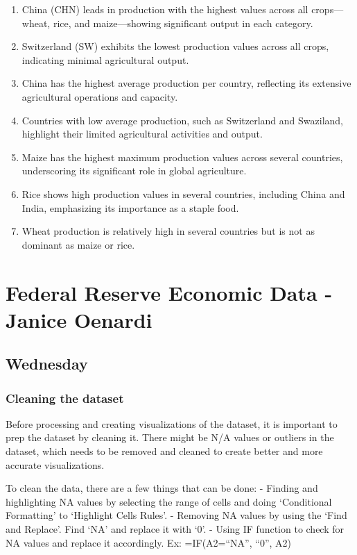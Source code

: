 \documentclass[
  letterpaper,
  DIV=11,
  numbers=noendperiod]{scrreprt}
\begin{document}
\begin{enumerate}
\def\labelenumi{\arabic{enumi}.}
\item
  China (CHN) leads in production with the highest values across all
  crops---wheat, rice, and maize---showing significant output in each
  category.
\item
  Switzerland (SW) exhibits the lowest production values across all
  crops, indicating minimal agricultural output.
\item
  China has the highest average production per country, reflecting its
  extensive agricultural operations and capacity.
\item
  Countries with low average production, such as Switzerland and
  Swaziland, highlight their limited agricultural activities and output.
\item
  Maize has the highest maximum production values across several
  countries, underscoring its significant role in global agriculture.
\item
  Rice shows high production values in several countries, including
  China and India, emphasizing its importance as a staple food.
\item
  Wheat production is relatively high in several countries but is not as
  dominant as maize or rice.
\end{enumerate}


\chapter{Federal Reserve Economic Data - Janice
Oenardi}\label{federal-reserve-economic-data---janice-oenardi}

\section{Wednesday}\label{wednesday-2}

\subsection{Cleaning the dataset}\label{cleaning-the-dataset}

Before processing and creating visualizations of the dataset, it is
important to prep the dataset by cleaning it. There might be N/A values
or outliers in the dataset, which needs to be removed and cleaned to
create better and more accurate visualizations.

To clean the data, there are a few things that can be done: - Finding
and highlighting NA values by selecting the range of cells and doing
`Conditional Formatting' to `Highlight Cells Rules'. - Removing NA
values by using the `Find and Replace'. Find `NA' and replace it with
`0'. - Using IF function to check for NA values and replace it
accordingly. Ex: =IF(A2=``NA'', ``0'', A2)
\end{document}
